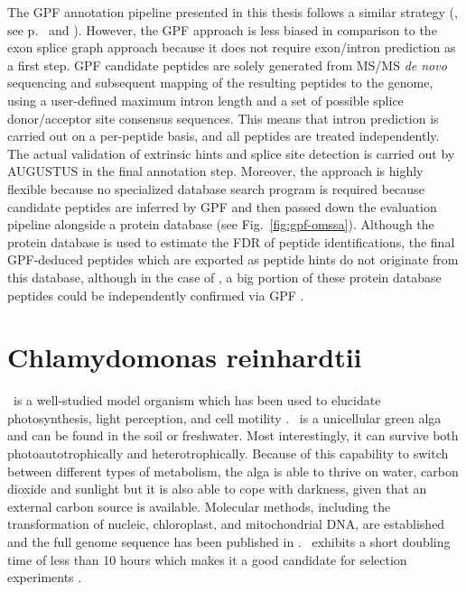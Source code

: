 The GPF annotation pipeline presented in this thesis follows a similar strategy
(\cite{Specht2011_GPF}, see p.~\pageref{section:gpf} and \pageref{paper:gpf}).
However, the GPF approach is less biased in comparison to the exon splice graph
approach because it does not require exon/intron prediction as a first step.
GPF candidate peptides are solely generated from MS/MS {\em de novo} sequencing
and subsequent mapping of the resulting peptides to the genome, using 
a user-defined maximum intron length and a set of possible splice donor/acceptor 
site consensus sequences.
This means that intron prediction is carried out on a per-peptide basis, and
all peptides are treated independently.
The actual validation of extrinsic hints and splice site detection is
carried out by AUGUSTUS in the final annotation step.
Moreover, the approach is highly flexible because no specialized database
search program is required because candidate peptides are inferred by GPF
and then passed down the evaluation pipeline alongside a protein database
(see Fig.~\ref{fig:gpf-omssa}).
Although the protein database is used to estimate the FDR of peptide 
identifications, the final GPF-deduced peptides which are exported as
peptide hints do not originate from this database, although in the case
of \cre, a big portion of these protein database peptides could be 
independently confirmed via GPF \citep{Specht2011_GPF}.



\section{Chlamydomonas reinhardtii}

\chlre~is a well-studied model organism which has been used to elucidate 
photosynthesis, light perception, and cell motility \citep{Harris2001}.
\cre~is a unicellular green alga and can be found in the soil or freshwater.
Most interestingly, it can survive both photoautotrophically and 
heterotrophically.
Because of this capability to switch between different types of metabolism, 
the alga is able to thrive on water, carbon dioxide and sunlight but it is
also able to cope with darkness, given that an external carbon source is 
available.
Molecular methods, including the transformation of nucleic, chloroplast, and
mitochondrial DNA, are established and the full genome sequence has been 
published in \citeyear{Merchant2007} \citep{Merchant2007}.
\cre~exhibits a short doubling time of less than 10 hours which makes it 
a good candidate for selection experiments \citep{Dent2001}.

